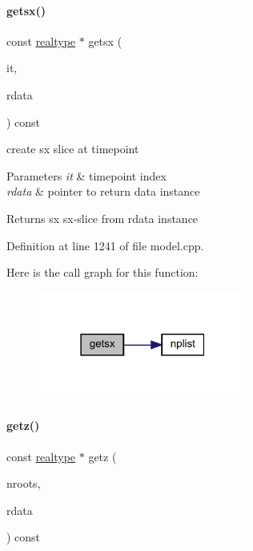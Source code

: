 \paragraph{\texorpdfstring{getsx()}{getsx()}}
{\footnotesize\ttfamily const \mbox{\hyperlink{namespaceamici_a1bdce28051d6a53868f7ccbf5f2c14a3}{realtype}} $\ast$ getsx (\begin{DoxyParamCaption}\item[{const int}]{it,  }\item[{const \mbox{\hyperlink{classamici_1_1_return_data}{Return\+Data}} $\ast$}]{rdata }\end{DoxyParamCaption}) const\hspace{0.3cm}{\ttfamily [protected]}}

create sx slice at timepoint 
\begin{DoxyParams}{Parameters}
{\em it} & timepoint index \\
\hline
{\em rdata} & pointer to return data instance \\
\hline
\end{DoxyParams}
\begin{DoxyReturn}{Returns}
sx sx-\/slice from rdata instance 
\end{DoxyReturn}


Definition at line 1241 of file model.\+cpp.

Here is the call graph for this function\+:
\nopagebreak
\begin{figure}[H]
\begin{center}
\leavevmode
\includegraphics[width=195pt]{classamici_1_1_model_ae808a142aab292ef1b424bc3a0d924a0_cgraph}
\end{center}
\end{figure}
\mbox{\label{classamici_1_1_model_a30571e418f94ca61b8df2b355e46ee1a}} 
\paragraph{\texorpdfstring{getz()}{getz()}}
{\footnotesize\ttfamily const \mbox{\hyperlink{namespaceamici_a1bdce28051d6a53868f7ccbf5f2c14a3}{realtype}} $\ast$ getz (\begin{DoxyParamCaption}\item[{const int}]{nroots,  }\item[{const \mbox{\hyperlink{classamici_1_1_return_data}{Return\+Data}} $\ast$}]{rdata }\end{DoxyParamCaption}) const\hspace{0.3cm}{\ttfamily [protected]}}

